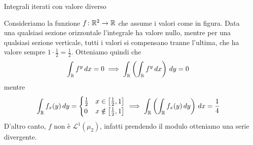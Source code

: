 \documentclass[a4paper]{article}
\begin{document}
\begin{radioactive}
\begin{snippetexample}{Integrali iterati con valore diverso}
    \begin{figure}
        \begin{center}
            \vspace{-1.25cm}
        \end{center}
    \end{figure}
    Consideriamo la funzione \(f \colon \mathbb{R}^2 \to \mathbb{R}\)
    che assume i valori come in figura.
    Data una qualsiasi sezione orizzontale l'integrale ha valore nullo,
    mentre per una qualsiasi sezione verticale, tutti i valori si compensano tranne l'ultima,
    che ha valore sempre \(1 \cdot \frac12 = \frac12\).
    Otteniamo quindi che \[
        \int_{\mathbb{R}} f^y\,dx = 0 \implies
        \int_{\mathbb{R}} \left(
            \int_{\mathbb{R}} f^y\,dx
        \right)\,dy = 0
    \]
    mentre
    \[
        \int_{\mathbb{R}} f_x(y)\,dy
        =
        \begin{cases}
            \frac12 & x \in \left[\frac12,1\right] \\
            0 & x \notin \left[\frac12,1\right]
        \end{cases}
        \implies
        \int_{\mathbb{R}} \left(
            \int_{\mathbb{R}} f_x(y)\,dy
        \right)\,dx = \frac14
    \]
    D'altro canto, \(f\) non è \(\mathcal L^1(\mu_2)\),
    infatti prendendo il modulo otteniamo una serie divergente.
    \wrapfill
\end{snippetexample}
\end{radioactive}
\end{document}
